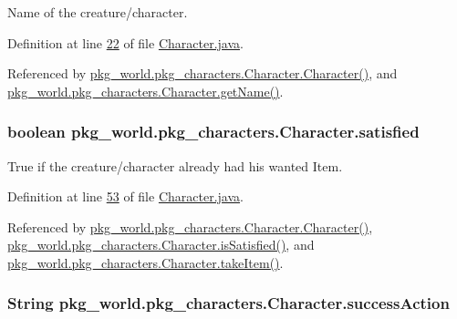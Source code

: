 Name of the creature/character. 



Definition at line \hyperlink{Character_8java_source_l00022}{22} of file \hyperlink{Character_8java_source}{Character.\-java}.



Referenced by \hyperlink{Character_8java_source_l00062}{pkg\-\_\-world.\-pkg\-\_\-characters.\-Character.\-Character()}, and \hyperlink{Character_8java_source_l00132}{pkg\-\_\-world.\-pkg\-\_\-characters.\-Character.\-get\-Name()}.

\hypertarget{classpkg__world_1_1pkg__characters_1_1Character_a63a989f34f7ec28cf9e8c6c2a19c7daa}{
\subsubsection[{satisfied}]{\setlength{\rightskip}{0pt plus 5cm}boolean pkg\-\_\-world.\-pkg\-\_\-characters.\-Character.\-satisfied\hspace{0.3cm}{\ttfamily [private]}}}\label{classpkg__world_1_1pkg__characters_1_1Character_a63a989f34f7ec28cf9e8c6c2a19c7daa}


True if the creature/character already had his wanted Item. 



Definition at line \hyperlink{Character_8java_source_l00053}{53} of file \hyperlink{Character_8java_source}{Character.\-java}.



Referenced by \hyperlink{Character_8java_source_l00062}{pkg\-\_\-world.\-pkg\-\_\-characters.\-Character.\-Character()}, \hyperlink{Character_8java_source_l00136}{pkg\-\_\-world.\-pkg\-\_\-characters.\-Character.\-is\-Satisfied()}, and \hyperlink{Character_8java_source_l00113}{pkg\-\_\-world.\-pkg\-\_\-characters.\-Character.\-take\-Item()}.

\hypertarget{classpkg__world_1_1pkg__characters_1_1Character_a3f1c0fc80b859a8625f334782b1bb74a}{
\subsubsection[{success\-Action}]{\setlength{\rightskip}{0pt plus 5cm}String pkg\-\_\-world.\-pkg\-\_\-characters.\-Character.\-success\-Action\hspace{0.3cm}{\ttfamily [private]}}}\label{classpkg__world_1_1pkg__characters_1_1Character_a3f1c0fc80b859a8625f334782b1bb74a}


